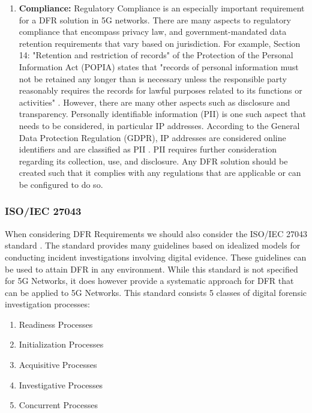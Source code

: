 \documentclass[final,1p,times,authoryear]{elsarticle}
\begin{document}
\begin{enumerate}[label=\thesubsection.\arabic*]
	\item \textbf{Compliance:}
Regulatory Compliance is an especially important requirement for a DFR solution in 5G networks. There are many aspects to regulatory compliance that encompass privacy law, and government-mandated data retention requirements that vary based on jurisdiction. For example, Section 14: "Retention and restriction of records"  of the Protection of the Personal Information Act (POPIA) states that "records of personal information must not be retained any longer than is necessary unless the responsible party reasonably requires the records for lawful purposes related to its functions or activities" \citep{POPIA2019}. However, there are many other aspects such as disclosure and transparency. Personally identifiable information (PII) is one such aspect that needs to be considered, in particular IP addresses. According to the  General Data Protection Regulation (GDPR), IP addresses are considered online identifiers and are classified as PII \citep{regulation2016regulation}. PII requires further consideration regarding its collection, use, and disclosure.  Any DFR solution should be created such that it complies with any regulations that are applicable or can be configured to do so.
\end{enumerate}

\subsubsection{ISO/IEC 27043}
\label{sub2sub2sec2}
When considering DFR Requirements we should also consider the ISO/IEC 27043 standard \citep{valjarevic2016iso} \citep{iso27043}. The standard provides many guidelines based on idealized models for conducting incident investigations involving digital evidence. These guidelines can be used to attain DFR in any environment. While this standard is not specified for 5G Networks, it does however provide a systematic approach for DFR that can be applied to 5G Networks. This standard consists 5 classes of digital forensic investigation processes: 

\begin{enumerate}
	\item Readiness Processes
	\item Initialization Processes
	\item Acquisitive Processes
	\item Investigative Processes 
	\item Concurrent Processes
\end{enumerate}
\end{document}
